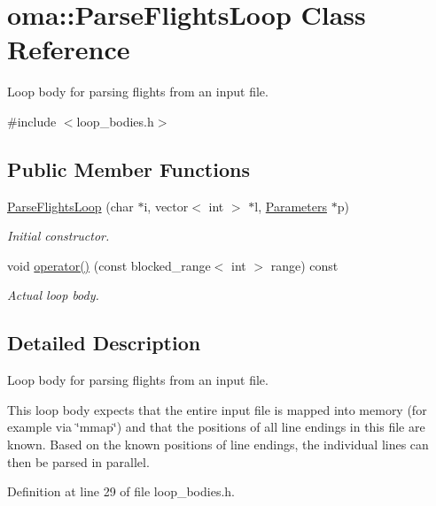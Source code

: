 \hypertarget{classoma_1_1_parse_flights_loop}{\section{oma\-:\-:Parse\-Flights\-Loop Class Reference}
\label{classoma_1_1_parse_flights_loop}
}


Loop body for parsing flights from an input file.  




{\ttfamily \#include $<$loop\-\_\-bodies.\-h$>$}

\subsection*{Public Member Functions}
\begin{DoxyCompactItemize}
\item 
\hyperlink{classoma_1_1_parse_flights_loop_a920ed611f2613cf4926da79c6c4d65f2}{Parse\-Flights\-Loop} (char $\ast$i, vector$<$ int $>$ $\ast$l, \hyperlink{struct_parameters}{Parameters} $\ast$p)
\begin{DoxyCompactList}\small\item\em Initial constructor. \end{DoxyCompactList}\item 
void \hyperlink{classoma_1_1_parse_flights_loop_a27c23acb7356b61efbcafd1a3c60ef0e}{operator()} (const blocked\-\_\-range$<$ int $>$ range) const 
\begin{DoxyCompactList}\small\item\em Actual loop body. \end{DoxyCompactList}\end{DoxyCompactItemize}


\subsection{Detailed Description}
Loop body for parsing flights from an input file. 

This loop body expects that the entire input file is mapped into memory (for example via \char`\"{}mmap\char`\"{}) and that the positions of all line endings in this file are known. Based on the known positions of line endings, the individual lines can then be parsed in parallel. 

Definition at line 29 of file loop\-\_\-bodies.\-h.



